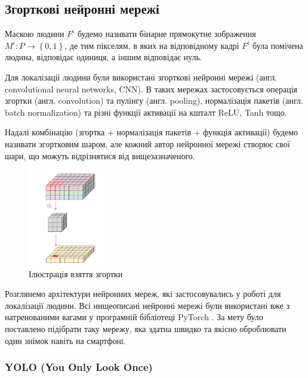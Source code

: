 \subsection{Згорткові нейронні мережі}

\begin{definition}
    Маскою людини \(F^{i}\) будемо називати бінарне прямокутне
    зображення \(M^{i}:P \rightarrow \left\{ 0,1 \right\}\), де тим
    пікселям, в яких на відповідному кадрі \(F^{i}\) була помічена людина,
    відповідає одиниця, а іншим відповідає нуль.
\end{definition}
Для локалізації людини були використані згорткові нейронні мережі
(англ. convolutional neural networks, CNN).
В таких мережах застосовується операція згортки (англ. convolution)
та пулінгу (англ. pooling), нормалізація пакетів (англ. batch normalization)
та різні функції активації на кшталт ReLU, Tanh тощо.

Надалі комбінацію (згортка + нормалізація пакетів + функція активації)
будемо називати згортковим шаром, але кожний автор нейронної мережі
створює свої шари, що можуть відрізнятися від вищезазначеного.

\begin{figure}[H]
    \centering
    \includegraphics[width=0.3\textwidth]{images/cnn_conv_operation}
    \caption{Ілюстрація взяття згортки  \cite{deep_wise_sep_conv_website}
        \label{fig:cnn:conv_operation}
    }
\end{figure}

Розглянемо архітектури нейронних мереж, які застосовувались у роботі
для локалізації людини. Всі нищеописані нейронні мережі були використані вже з
натренованими вагами у програмній бібліотеці PyTorch \cite{pytorch_library}.
За мету було поставлено підібрати таку мережу, яка здатна швидко та якісно оброблювати
один знімок навіть на смартфоні.

\subsubsection{YOLO (You Only Look Once)}

